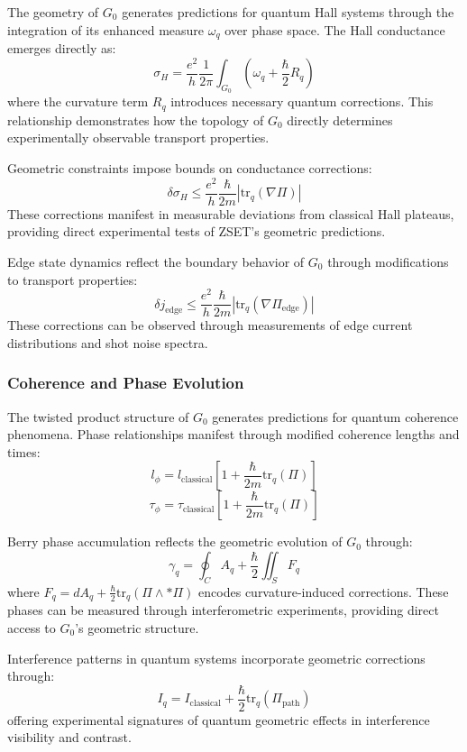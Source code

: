 \documentclass[10pt]{article}
\begin{document}
The geometry of \(G_0\) generates predictions for quantum Hall systems through the integration of its enhanced measure \(\omega_q\) over phase space. The Hall conductance emerges directly as:
\[
\sigma_H = \frac{e^2}{h} \frac{1}{2\pi} \int_{G_0} \left( \omega_q + \frac{\hbar}{2} R_q \right)
\]
where the curvature term \(R_q\) introduces necessary quantum corrections. This relationship demonstrates how the topology of \(G_0\) directly determines experimentally observable transport properties.

Geometric constraints impose bounds on conductance corrections:
\[
\delta\sigma_H \leq \frac{e^2}{h} \frac{\hbar}{2m} \left| \text{tr}_q (\nabla\Pi) \right|
\]
These corrections manifest in measurable deviations from classical Hall plateaus, providing direct experimental tests of ZSET's geometric predictions.

Edge state dynamics reflect the boundary behavior of \(G_0\) through modifications to transport properties:
\[
\delta j_\text{edge} \leq \frac{e^2}{h} \frac{\hbar}{2m} \left| \text{tr}_q (\nabla\Pi_\text{edge}) \right|
\]
These corrections can be observed through measurements of edge current distributions and shot noise spectra.

\subsubsection{Coherence and Phase Evolution}

The twisted product structure of \(G_0\) generates predictions for quantum coherence phenomena. Phase relationships manifest through modified coherence lengths and times:
\[
l_\phi = l_\text{classical} \left[1 + \frac{\hbar}{2m} \text{tr}_q (\Pi)\right]
\]
\[
\tau_\phi = \tau_\text{classical} \left[1 + \frac{\hbar}{2m} \text{tr}_q (\Pi)\right]
\]

Berry phase accumulation reflects the geometric evolution of \(G_0\) through:
\[
\gamma_q = \oint_C A_q + \frac{\hbar}{2} \iint_S F_q
\]
where \(F_q = dA_q + \frac{\hbar}{2}\text{tr}_q (\Pi \wedge *\Pi)\) encodes curvature-induced corrections. These phases can be measured through interferometric experiments, providing direct access to \(G_0\)'s geometric structure.

Interference patterns in quantum systems incorporate geometric corrections through:
\[
I_q = I_\text{classical} + \frac{\hbar}{2} \text{tr}_q (\Pi_\text{path})
\]
offering experimental signatures of quantum geometric effects in interference visibility and contrast.
\end{document}

